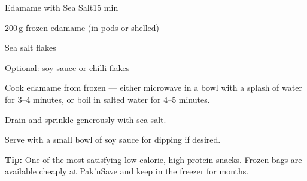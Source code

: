 \begin{recipebox}{Edamame with Sea Salt}{1}{5 min}
\begin{ingredients}
  \item 200\,g frozen edamame (in pods or shelled)
  \item Sea salt flakes
  \item Optional: soy sauce or chilli flakes
\end{ingredients}

\begin{method}
  \item Cook edamame from frozen --- either microwave in a bowl with a splash of water for 3--4 minutes, or boil in salted water for 4--5 minutes.
  \item Drain and sprinkle generously with sea salt.
  \item Serve with a small bowl of soy sauce for dipping if desired.
\end{method}

\begin{notelist}
  \item \textbf{Tip:} One of the most satisfying low-calorie, high-protein snacks. Frozen bags are available cheaply at Pak'nSave and keep in the freezer for months.
\end{notelist}
\end{recipebox}
